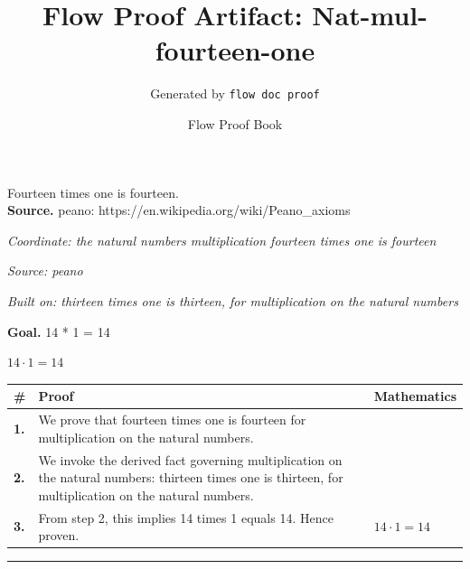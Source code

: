 \documentclass[11pt]{article}
\title{Flow Proof Artifact: Nat-mul-fourteen-one}
\author{Generated by \texttt{flow doc proof}}
\date{Flow Proof Book}
\theoremstyle{definition}
\begin{document}
\maketitle
Fourteen times one is fourteen.\\[0.5em]
\textbf{Source.} peano: https://en.wikipedia.org/wiki/Peano\_axioms\\[0.5em]
\bigskip
{}\par
\smallskip\noindent\textit{Coordinate: the natural numbers \cdot multiplication \cdot fourteen times one is fourteen}\par
\smallskip\noindent\textit{Source: peano}\par
\smallskip\noindent\textit{Built on: thirteen times one is thirteen, for multiplication on the natural numbers}\par
\medskip
\noindent\textbf{Goal.} 14 * 1 = 14\par
\noindent$\displaystyle 14 \cdot 1 = 14$\par
\medskip
\noindent
\begin{tabular}{@{} >{\raggedright\arraybackslash}p{} >{\raggedright\arraybackslash}p{} >{\raggedleft\arraybackslash}p{} @{}}
\textbf{\#} & \textbf{Proof} & \textbf{Mathematics} \\
\midrule
\textbf{1.} & We prove that fourteen times one is fourteen for multiplication on the natural numbers. & \\[0.45em]
\textbf{2.} & We invoke the derived fact governing multiplication on the natural numbers: thirteen times one is thirteen, for multiplication on the natural numbers. & \\[0.45em]
\textbf{3.} & From step 2, this implies 14 times 1 equals 14. Hence proven. & $\displaystyle 14 \cdot 1 = 14$ \\[0.45em]
\bottomrule
\end{tabular}
\label{thm:Nat-multiplication-fourteen_times_one_is_fourteen}
\par\medskip\hrule
\end{document}
